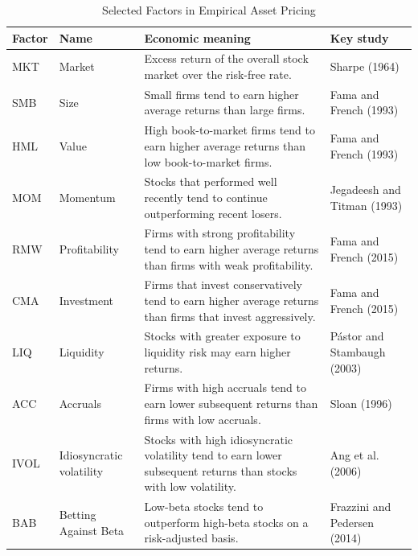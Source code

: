 \begin{table}[htbp]
\centering
\caption{Selected Factors in Empirical Asset Pricing}
\label{tab:04-factor-zoo}
\small
\begin{tabularx}{\textwidth}{l l X l}
\hline
\textbf{Factor} & \textbf{Name} & \textbf{Economic meaning} & \textbf{Key study} \\
\hline
MKT & Market
& Excess return of the overall stock market over the risk-free rate.
& Sharpe (1964) \\

SMB & Size
& Small firms tend to earn higher average returns than large firms.
& Fama and French (1993) \\

HML & Value
& High book-to-market firms tend to earn higher average returns than low book-to-market firms.
& Fama and French (1993) \\

MOM & Momentum
& Stocks that performed well recently tend to continue outperforming recent losers.
& Jegadeesh and Titman (1993) \\

RMW & Profitability
& Firms with strong profitability tend to earn higher average returns than firms with weak profitability.
& Fama and French (2015) \\

CMA & Investment
& Firms that invest conservatively tend to earn higher average returns than firms that invest aggressively.
& Fama and French (2015) \\

LIQ & Liquidity
& Stocks with greater exposure to liquidity risk may earn higher returns.
& Pástor and Stambaugh (2003) \\

ACC & Accruals
& Firms with high accruals tend to earn lower subsequent returns than firms with low accruals.
& Sloan (1996) \\

IVOL & Idiosyncratic volatility
& Stocks with high idiosyncratic volatility tend to earn lower subsequent returns than stocks with low volatility.
& Ang et al. (2006) \\

BAB & Betting Against Beta
& Low-beta stocks tend to outperform high-beta stocks on a risk-adjusted basis.
& Frazzini and Pedersen (2014) \\
\hline
\end{tabularx}
\end{table}

